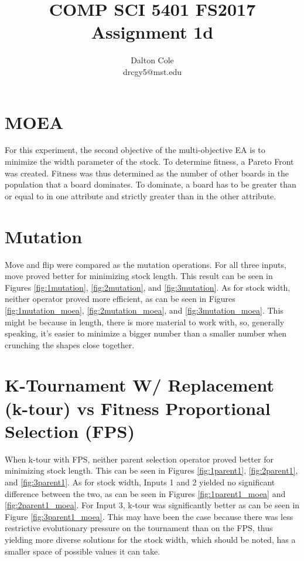 \documentclass[times]{article}
\begin{document}
	\title{COMP SCI 5401 FS2017 Assignment 1d}
	\author{Dalton Cole \\ drcgy5@mst.edu}
	\date{}
	\maketitle

	\section{MOEA}
	For this experiment, the second objective of the multi-objective EA is to minimize the width parameter of the stock. To determine fitness, a Pareto Front was created. Fitness was thus determined as the number of other boards in the population that a board dominates. To dominate, a board has to be greater than or equal to in one attribute and strictly greater than in the other attribute. 

	\section{Mutation}
	Move and flip were compared as the mutation operations. For all three inputs, move proved better for minimizing stock length. This result can be seen in Figures \ref{fig:1mutation}, \ref{fig:2mutation}, and \ref{fig:3mutation}. As for stock width, neither operator proved more efficient, as can be seen in Figures \ref{fig:1mutation_moea}, \ref{fig:2mutation_moea}, and \ref{fig:3mutation_moea}. This might be because in length, there is more material to work with, so, generally speaking, it's easier to minimize a bigger number than a smaller number when crunching the shapes close together.

	\section{K-Tournament W/ Replacement (k-tour) vs Fitness Proportional Selection (FPS)}
	When k-tour with FPS, neither parent selection operator proved better for minimizing stock length. This can be seen in Figures \ref{fig:1parent1}, \ref{fig:2parent1}, and \ref{fig:3parent1}. As for stock width, Inputs 1 and 2 yielded no significant difference between the two, as can be seen in Figures \ref{fig:1parent1_moea} and \ref{fig:2parent1_moea}. For Input 3, k-tour was significantly better as can be seen in Figure \ref{fig:3parent1_moea}. This may have been the case because there was less restrictive evolutionary pressure on the tournament than on the FPS, thus yielding more diverse solutions for the stock width, which should be noted, has a smaller space of possible values it can take.
\end{document}
